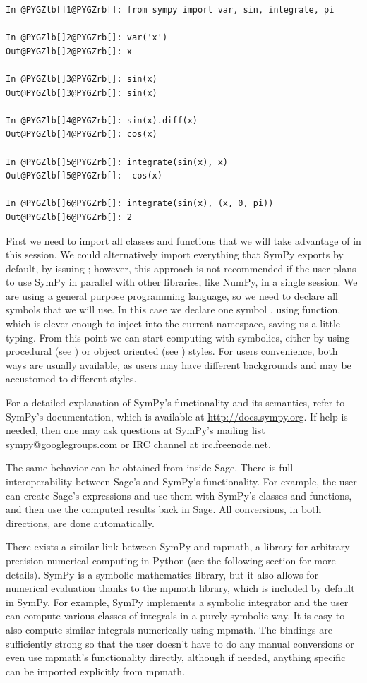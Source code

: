 \begin{Verbatim}[commandchars=@\[\]]
In @PYGZlb[]1@PYGZrb[]: from sympy import var, sin, integrate, pi

In @PYGZlb[]2@PYGZrb[]: var('x')
Out@PYGZlb[]2@PYGZrb[]: x

In @PYGZlb[]3@PYGZrb[]: sin(x)
Out@PYGZlb[]3@PYGZrb[]: sin(x)

In @PYGZlb[]4@PYGZrb[]: sin(x).diff(x)
Out@PYGZlb[]4@PYGZrb[]: cos(x)

In @PYGZlb[]5@PYGZrb[]: integrate(sin(x), x)
Out@PYGZlb[]5@PYGZrb[]: -cos(x)

In @PYGZlb[]6@PYGZrb[]: integrate(sin(x), (x, 0, pi))
Out@PYGZlb[]6@PYGZrb[]: 2
\end{Verbatim}
\noindent
First we need to import all classes and functions that we will take
advantage of in this session. We could alternatively import everything
that SymPy exports by default, by issuing ;
however, this approach is not recommended if the user plans to use
SymPy in parallel with other libraries, like NumPy, in a single
session. We are using a general purpose programming language, so we
need to declare all symbols that we will use. In this case we declare
one symbol , using  function, which is clever enough
to inject  into the current namespace, saving us a little
typing. From this point we can start computing with symbolics, either
by using procedural (see ) or object oriented (see
) styles. For users convenience, both ways are usually
available, as users may have different backgrounds and may be
accustomed to different styles.

For a detailed explanation of SymPy's functionality and its semantics,
refer to SymPy's documentation, which is available at
\href{http://docs.sympy.org}{http://docs.sympy.org}. If help is needed, then one may ask questions
at SymPy's mailing list \href{mailto:sympy@googlegroups.com}{sympy@googlegroups.com} or IRC channel
 at irc.freenode.net.

The same behavior can be obtained from inside Sage. There is full
interoperability between Sage's and SymPy's functionality. For
example, the user can create Sage's expressions and use them with
SymPy's classes and functions, and then use the computed results back
in Sage. All conversions, in both directions, are done automatically.

There exists a similar link between SymPy and mpmath, a library for
arbitrary precision numerical computing in Python (see the following
section for more details). SymPy is a symbolic mathematics library,
but it also allows for numerical evaluation thanks to the mpmath
library, which is included by default in SymPy. For example, SymPy
implements a symbolic integrator and the user can compute various
classes of integrals in a purely symbolic way. It is easy to also
compute similar integrals numerically using mpmath.  The bindings are
sufficiently strong so that the user doesn't have to do any manual
conversions or even use mpmath's functionality directly, although if
needed, anything specific can be imported explicitly from mpmath.

